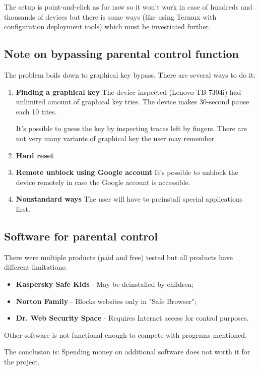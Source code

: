 The setup is point-and-click as for now so it won't work in case of
hundreds and thousands of devices but there is some ways (like using
Termux with configuration deployment tools) which must be investiated
further.


\subsection{Note on bypassing parental control function}

The problem boils down to graphical key bypass. There are
several ways to do it:

\begin{enumerate}
\item \textbf{Finding a graphical key}
The device inspected (Lenovo TB-7304i) had unlimited amount of
graphical key tries. The device makes 30-second pause each 10 tries.

It's possible to guess the key by inspecting traces left by fingers.
There are not very many variants of graphical key the user may remember
\item \textbf{Hard reset}
\item \textbf{Remote unblock using Google account}
It's possible to unblock the device remotely in case the Google account
is accessible.
\item \textbf{Nonstandard ways}
The user will have to preinstall special applications first.
\end{enumerate}


\subsection{Software for parental control}

There were multiple products (paid and free) tested but all products
have different limitations:

\begin{itemize}
\item \textbf{Kaspersky Safe Kids} - May be deinstalled by children;
\item \textbf{Norton Family} - Blocks websites only in "Safe Browser";
\item \textbf{Dr. Web Security Space} - Requires Internet access for
control purposes.
\end{itemize}

Other software is not functional enough to compete with programs
mentioned.

The conclusion is: Spending money on additional software does not
worth it for the project.


